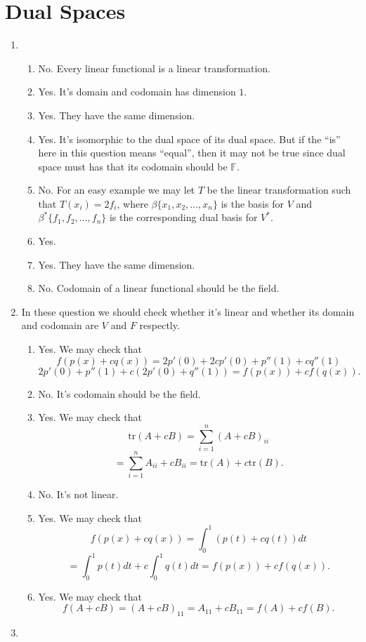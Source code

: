 \section{Dual Spaces}
\begin{enumerate}
\item \begin{enumerate}
\item No. Every linear functional is a linear transformation.
\item Yes. It's domain and codomain has dimension $1$.
\item Yes. They have the same dimension.
\item Yes. It's isomorphic to the dual space of its dual space. But if the ``is'' here in this question means ``equal'', then it may not be true since dual space must has that its codomain should be $\mathbb{F}$.
\item No. For an easy example we may let $T$ be the linear transformation such that $T(x_i)=2f_i$, where $\beta\{x_1,x_2,\ldots ,x_n\}$ is the basis for $V$ and $\beta^*\{f_1,f_2,\ldots ,f_n\}$ is the corresponding dual basis for $V^*$.
\item Yes.
\item Yes. They have the same dimension.
\item No. Codomain of a linear functional should be the field.
\end{enumerate}
\item In these question we should check whether it's linear and whether its domain and codomain are $V$ and $F$ respectly. \begin{enumerate}
\item Yes. We may check that \[f(p(x)+cq(x))=2p'(0)+2cp'(0)+p''(1)+cq''(1)\]
\[2p'(0)+p''(1)+c(2p'(0)+q''(1))=f(p(x))+cf(q(x)).\]
\item No. It's codomain should be the field.
\item Yes. We may check that \[\mathrm{tr}(A+cB)=\sum_{i=1}^n{(A+cB)_{ii}}\]
\[=\sum_{i=1}^n{A_{ii}+cB_{ii}}=\mathrm{tr}(A)+c\mathrm{tr}(B).\]
\item No. It's not linear.
\item Yes. We may check that \[f(p(x)+cq(x))=\int_0^1(p(t)+cq(t))dt\]
\[=\int_0^1p(t)dt+c\int_0^1q(t)dt=f(p(x))+cf(q(x)).\]
\item Yes. We may check that \[f(A+cB)=(A+cB)_{11}=A_{11}+cB_{11}=f(A)+cf(B).\]
\end{enumerate}
\item \begin{enumerate}

\end{enumerate}
\end{enumerate}
